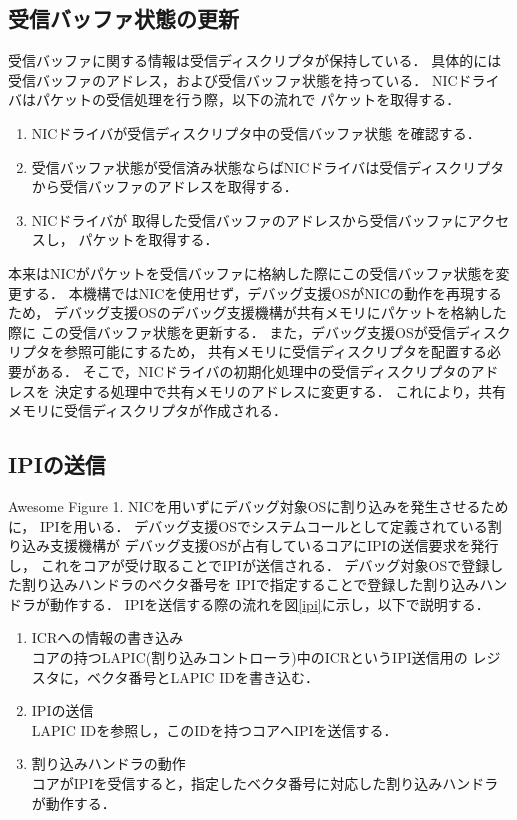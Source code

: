 \documentclass[tanilab-enum]{graduate}
\begin{document}
\subsection{受信バッファ状態の更新}
受信バッファに関する情報は受信ディスクリプタが保持している．
具体的には受信バッファのアドレス，および受信バッファ状態を持っている．
NICドライバはパケットの受信処理を行う際，以下の流れで
パケットを取得する．
\begin{enumerate}
    \item 
        NICドライバが受信ディスクリプタ中の受信バッファ状態
        を確認する．
    \item
        受信バッファ状態が受信済み状態ならばNICドライバは受信ディスクリプタ
        から受信バッファのアドレスを取得する．
    \item
        NICドライバが
        取得した受信バッファのアドレスから受信バッファにアクセスし，
        パケットを取得する．
\end{enumerate}
本来はNICがパケットを受信バッファに格納した際にこの受信バッファ状態を変更する．
本機構ではNICを使用せず，デバッグ支援OSがNICの動作を再現するため，
デバッグ支援OSのデバッグ支援機構が共有メモリにパケットを格納した際に
この受信バッファ状態を更新する．
また，デバッグ支援OSが受信ディスクリプタを参照可能にするため，
共有メモリに受信ディスクリプタを配置する必要がある．
そこで，NICドライバの初期化処理中の受信ディスクリプタのアドレスを
決定する処理中で共有メモリのアドレスに変更する．
これにより，共有メモリに受信ディスクリプタが作成される．
\subsection{IPIの送信}
{Awesome Figure 1.}
NICを用いずにデバッグ対象OSに割り込みを発生させるために，
IPIを用いる．
デバッグ支援OSでシステムコールとして定義されている割り込み支援機構が
デバッグ支援OSが占有しているコアにIPIの送信要求を発行し，
これをコアが受け取ることでIPIが送信される．
デバッグ対象OSで登録した割り込みハンドラのベクタ番号を
IPIで指定することで登録した割り込みハンドラが動作する．
IPIを送信する際の流れを図\ref{ipi}に示し，以下で説明する．
\begin{enumerate}
    \item ICRへの情報の書き込み\\
        コアの持つLAPIC(割り込みコントローラ)中のICRというIPI送信用の
        レジスタに，ベクタ番号とLAPIC IDを書き込む．
    \item IPIの送信\\
        LAPIC IDを参照し，このIDを持つコアへIPIを送信する．
    \item 割り込みハンドラの動作\\
        コアがIPIを受信すると，指定したベクタ番号に対応した割り込みハンドラが動作する．
\end{enumerate}
\end{document}
